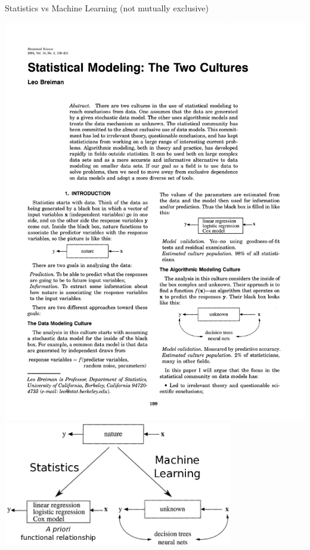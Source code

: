 \documentclass[pdf]{beamer}
\begin{document}
\begin{frame}{Statistics vs Machine Learning (not mutually exclusive)}
\begin{center}
	\includegraphics[width=\textwidth]{breimanPaper.pdf}\\
	\includegraphics[width=0.75\textwidth]{statsvsML.png}
\end{center}
\end{frame}
\end{document}
